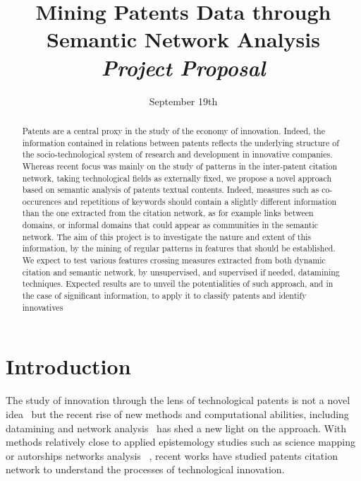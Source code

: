 


\title{Mining Patents Data through Semantic Network Analysis\bigskip\\
\textit{Project Proposal}
}
\author{}
\date{September 19th}


\maketitle

\justify


\begin{abstract}
Patents are a central proxy in the study of the economy of innovation. Indeed, the information contained in relations between patents reflects the underlying structure of the socio-technological system of research and development in innovative companies. Whereas recent focus was mainly on the study of patterns in the inter-patent citation network, taking technological fields as externally fixed, we propose a novel approach based on semantic analysis of patents textual contents. Indeed, measures such as co-occurences and repetitions of keywords should contain a slightly different information than the one extracted from the citation network, as for example links between domains, or informal domains that could appear as communities in the semantic network. The aim of this project is to investigate the nature and extent of this information, by the mining of regular patterns in features that should be established. We expect to test various features crossing measures extracted from both dynamic citation and semantic network, by unsupervised, and supervised if needed, datamining techniques. Expected results are to unveil the potentialities of such approach, and in the case of significant information, to apply it to classify patents and identify innovatives
\end{abstract}


\section{Introduction}


The study of innovation through the lens of technological patents is not a novel idea~\cite{}%
but the recent rise of new methods and computational abilities, including datamining and network analysis~\cite{}%
has shed a new light on the approach. With methods relatively close to applied epistemology studies such as science mapping~\cite{}
or autorships networks analysis~\cite{}
, recent works have studied patents citation network to understand the processes of technological innovation.







